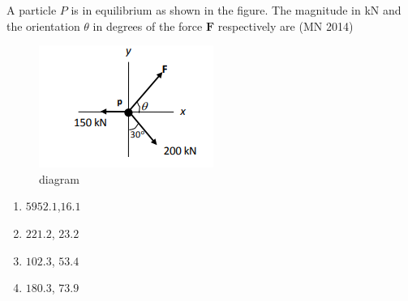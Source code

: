 \item A particle $P$ is in equilibrium as shown in the figure. The magnitude in kN and the orientation $\theta$ in degrees of the force $\mathbf{F}$ respectively are 
	\hfill (MN 2014)
\begin{figure}[H]
  \centering
  \includegraphics[width=0.4\columnwidth]{GATE/2014/MN/figs/diagram.png}
  \caption{diagram}
  \label{fig:36}
\end{figure}
\begin{multicols}{4}
\begin{enumerate}
\item $5952.1$,$16.1$
\item $221.2$, $23.2$
\item $ 102.3$, $53.4$
\item $180.3$, $73.9$
\end{enumerate}
\end{multicols}


